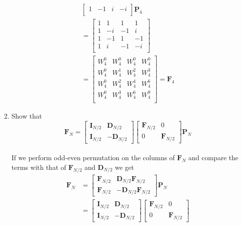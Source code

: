 \documentclass[journal,12pt,twocolumn]{IEEEtran}
\let\vec\mathbf
\renewcommand\thesection{\arabic{section}}
\begin{document}
\begin{enumerate}[label=\arabic*.,ref=\thesection.\theenumi]
\begin{align}
\begin{bmatrix}
		1	&	-1	&	i	&	-i\\
	\end{bmatrix}\vec{P}_{4}\\
	=\begin{bmatrix}
		1	&	1	&	1	&	1\\
		1	&	-i	&	-1	&	i\\
		1	&	-1	&	1	&	-1\\
		1	&	i	&	-1	&	-i\\
	\end{bmatrix}\\
	= \begin{bmatrix}
		W_{4}^0	&	W_{4}^0	&	W_{4}^0	&	W_{4}^0\\
		W_{4}^0	&	W_{4}^1	&	W_{4}^2	&	W_{4}^3\\
		W_{4}^0	&	W_{4}^2	&	W_{4}^4	&	W_{4}^6\\
		W_{4}^0	&	W_{4}^3	&	W_{4}^6	&	W_{4}^9\\
	\end{bmatrix} = \vec{F}_{4}
\end{align}
\item Show that 
\begin{equation}
	\vec{F}_{N}=
	\begin{bmatrix}
		\vec{I}_{N/2} & \vec{D}_{N/2} \\
		\vec{I}_{N/2} & -\vec{D}_{N/2}
	\end{bmatrix}
	\begin{bmatrix}
		\vec{F}_{N/2} & 0 \\
		0 & \vec{F}_{N/2}
	\end{bmatrix}
	\vec{P}_{N}
\end{equation}
\solution\\
If we perform odd-even permutation on the columns of $\vec{F}_{N}$ and compare the terms with that of $\vec{F}_{N/2}$ and $\vec{D}_{N/2}$ we get
\begin{align}
	\vec{F}_{N}&=
	\begin{bmatrix}
		\vec{F}_{N/2} & \vec{D}_{N/2}\vec{F}_{N/2} \\
		\vec{F}_{N/2} & -\vec{D}_{N/2}\vec{F}_{N/2}
	\end{bmatrix}
	\vec{P}_{N}\\
	&=\begin{bmatrix}
		\vec{I}_{N/2} & \vec{D}_{N/2} \\
		\vec{I}_{N/2} & -\vec{D}_{N/2}
	\end{bmatrix}
	\begin{bmatrix}
		\vec{F}_{N/2} & 0 \\
		0 & \vec{F}_{N/2}

\end{bmatrix}
\end{align}
\end{enumerate}
\end{document}
